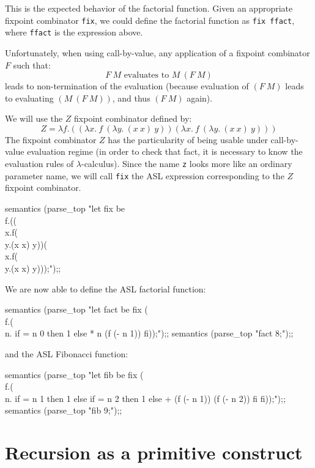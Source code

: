 This is the expected behavior of the factorial function. Given an
appropriate fixpoint combinator {\tt fix}, we could define the
factorial function as {\tt fix ffact}, where {\tt ffact} is the
expression above.

Unfortunately, when using call-by-value, any application of a fixpoint
combinator $F$ such that:
\[
F~M \mbox{ evaluates to } M~(F~M)
\]
leads to non-termination of the evaluation (because evaluation of
$(F~M)$ leads to evaluating $(M~(F~M))$, and thus $(F~M)$ again).

We will use the $Z$ fixpoint combinator defined by:
\[
Z = \lambda f.((\lambda x.~f~(\lambda y.~(x ~x)~y)) (\lambda
x.~f~(\lambda y.~(x ~x)~y)))
\]
The fixpoint combinator $Z$ has the particularity of being usable
under call-by-value evaluation regime (in order to check that fact, it
is necessary to know the evaluation rules of $\lambda$-calculus).
Since the name {\tt z} looks more like an ordinary parameter name, we
will call {\tt fix} the ASL expression corresponding to the $Z$
fixpoint combinator.
%
\begin{caml_example}
semantics (parse_top
        "let fix be \\f.((\\x.f(\\y.(x x) y))(\\x.f(\\y.(x x) y)));");;
\end{caml_example}
%
We are now able to define the ASL factorial function:
\begin{caml_example}
semantics (parse_top
        "let fact be fix (\\f.(\\n. if = n 0 then 1
                                    else * n (f (- n 1)) fi));");;
semantics (parse_top "fact 8;");;
\end{caml_example}
and the ASL Fibonacci function:
\begin{caml_example}
semantics (parse_top
        "let fib be fix (\\f.(\\n. if = n 1 then 1
                                   else if = n 2 then 1
                                        else + (f (- n 1)) (f (- n 2)) fi fi));");;
semantics (parse_top "fib 9;");;
\end{caml_example}

\section{Recursion as a primitive construct}

